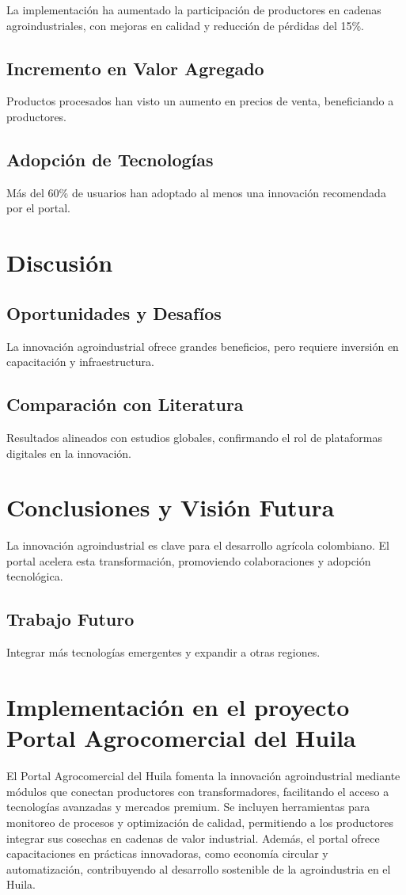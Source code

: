 La implementación ha aumentado la participación de productores en cadenas agroindustriales, con mejoras en calidad y reducción de pérdidas del 15\%.

\subsection{Incremento en Valor Agregado}
Productos procesados han visto un aumento en precios de venta, beneficiando a productores.

\subsection{Adopción de Tecnologías}
Más del 60\% de usuarios han adoptado al menos una innovación recomendada por el portal.

\section{Discusión}

\subsection{Oportunidades y Desafíos}
La innovación agroindustrial ofrece grandes beneficios, pero requiere inversión en capacitación y infraestructura.

\subsection{Comparación con Literatura}
Resultados alineados con estudios globales, confirmando el rol de plataformas digitales en la innovación.

\section{Conclusiones y Visión Futura}

La innovación agroindustrial es clave para el desarrollo agrícola colombiano. El portal acelera esta transformación, promoviendo colaboraciones y adopción tecnológica.

\subsection{Trabajo Futuro}
Integrar más tecnologías emergentes y expandir a otras regiones.

\section{Implementación en el proyecto Portal Agrocomercial del Huila}

El Portal Agrocomercial del Huila fomenta la innovación agroindustrial mediante módulos que conectan productores con transformadores, facilitando el acceso a tecnologías avanzadas y mercados premium. Se incluyen herramientas para monitoreo de procesos y optimización de calidad, permitiendo a los productores integrar sus cosechas en cadenas de valor industrial. Además, el portal ofrece capacitaciones en prácticas innovadoras, como economía circular y automatización, contribuyendo al desarrollo sostenible de la agroindustria en el Huila.